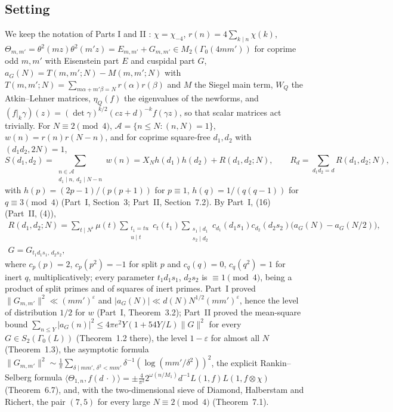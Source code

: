 \documentclass[11pt]{amsart}
\theoremstyle{remark}
\newcommand{\cA}{\mathcal{A}}
\newcommand{\e}{\varepsilon}
\begin{document}
\subsection{Setting}
We keep the notation of Parts I and II \cite{ChenI,ChenII}: $\chi=\chi_{-4}$, $r(n)=4\sum_{k\mid n}\chi(k)$, $\Theta_{m,m'}=\theta^2(mz)\theta^2(m'z)=E_{m,m'}+G_{m,m'}\in M_2(\Gamma_0(4mm'))$ for coprime odd $m,m'$ with Eisenstein part $E$ and cuspidal part $G$, $a_{G}(N)=T(m,m';N)-M(m,m';N)$ with $T(m,m';N)=\sum_{m\alpha+m'\beta=N}r(\alpha)r(\beta)$ and $M$ the Siegel main term, $W_Q$ the Atkin--Lehner matrices, $\eta_Q(f)$ the eigenvalues of the newforms, and $(f|_k\gamma)(z)=(\det\gamma)^{k/2}(cz+d)^{-k}f(\gamma z)$, so that scalar matrices act trivially. For $N\equiv2\pmod4$, $\cA=\{n\le N:(n,N)=1\}$, $w(n)=r(n)r(N-n)$, and for coprime square-free $d_1,d_2$ with $(d_1d_2,2N)=1$,
\[
S(d_1,d_2)=\sum_{\substack{n\in\cA\\ d_1\mid n,\ d_2\mid N-n}}w(n)=X_Nh(d_1)h(d_2)+R(d_1,d_2;N),\qquad R_d=\sum_{d_1d_2=d}R(d_1,d_2;N),
\]
with $h(p)=(2p-1)/(p(p+1))$ for $p\equiv1$, $h(q)=1/(q(q-1))$ for $q\equiv3\pmod4$ (Part~I, Section~3; Part~II, Section~7.2). By Part~I, (16) (Part~II, (4)),
\begin{multline}\label{eq:Rdecomp}
R(d_1,d_2;N)=\sum_{t\mid N^\flat}\mu(t)\sum_{\substack{t_1=tu\\ u\mid t}}c_t(t_1)\sum_{\substack{s_1\mid d_1\\ s_2\mid d_2}}c_{d_1}(d_1s_1)c_{d_2}(d_2s_2)\bigl(a_G(N)-a_G(N/2)\bigr),\\ G=G_{t_1d_1s_1,\,d_2s_2},
\end{multline}
where $c_p(p)=2$, $c_p(p^2)=-1$ for split $p$ and $c_q(q)=0$, $c_q(q^2)=1$ for inert $q$, multiplicatively; every parameter $t_1d_1s_1$, $d_2s_2$ is $\equiv1\pmod4$, being a product of split primes and of squares of inert primes. Part~I proved $\|G_{m,m'}\|^2\ll(mm')^\e$ and $|a_G(N)|\ll d(N)N^{1/2}(mm')^\e$, hence the level of distribution $1/2$ for $w$ (Part~I, Theorem~3.2); Part~II proved the mean-square bound $\sum_{n\le Y}|a_G(n)|^2\le4\pi e^2Y(1+54Y/L)\|G\|^2$ for every $G\in S_2(\Gamma_0(L))$ (Theorem~1.2 there), the level $1-\e$ for almost all $N$ (Theorem~1.3), the asymptotic formula $\|G_{m,m'}\|^2\sim\frac1\pi\sum_{\delta\mid mm',\,\delta^2<mm'}\delta^{-1}(\log(mm'/\delta^2))^2$, the explicit Rankin--Selberg formula $\langle\Theta_{1,n},f(d\,\cdot)\rangle=\pm\frac4{\pi^2}2^{\omega(n/M_1)}d^{-1}L(1,f)L(1,f\otimes\chi)$ (Theorem~6.7), and, with the two-dimensional sieve of Diamond, Halberstam and Richert, the pair $(7,5)$ for every large $N\equiv2\pmod4$ (Theorem~7.1).
\end{document}
